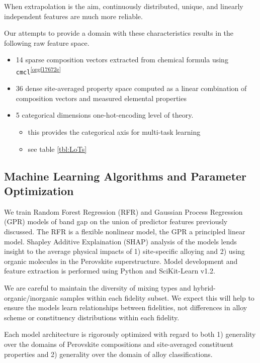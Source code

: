 When extrapolation is the aim, continuously distributed, unique, and linearly independent features are much more reliable.
\autocite{lux-2020-inter-spars} 

Our attempts to provide a domain with these characteristics results in the following raw feature space.

\begin{itemize}
\item 14 sparse composition vectors extracted from chemical formula using \texttt{cmcl}\textsuperscript{\ref{orgf17672e}}
\item 36 dense site-averaged property space computed as a linear combination of composition vectors and measured elemental properties \autocite{mentel-2014}
\item 5 categorical dimensions one-hot-encoding level of theory.
\begin{itemize}
\item this provides the categorical axis for multi-task learning
\item see table \ref{tbl:LoTs}
\end{itemize}
\end{itemize}

\subsection{Machine Learning Algorithms and Parameter Optimization}
\label{sec:org989a640}
We train Random Forest Regression (RFR) and Gaussian Process Regression (GPR) models of band gap on the union of predictor features previously discussed.
The RFR is a flexible nonlinear model, the GPR a principled linear model.
Shapley Additive Explaination (SHAP) analysis of the models lends insight to the average physical impacts of 1) site-specific alloying and 2) using organic molecules in the Perovskite superstructure.
 Model development and feature extraction is performed using Python and SciKit-Learn v1.2.
\autocite{pedregosa-2011-scikit-learn} 

We are careful to maintain the diversity of mixing types and hybrid-organic/inorganic samples within each fidelity subset.
We expect this will help to ensure the models learn relationships between fidelities, not differences in alloy scheme or constituency distributions within each fidelity.

Each model architecture is rigorously optimized with regard to both 1) generality over the domains of Perovskite compositions and site-averaged constituent properties and 2) generality over the domain of alloy classifications.

